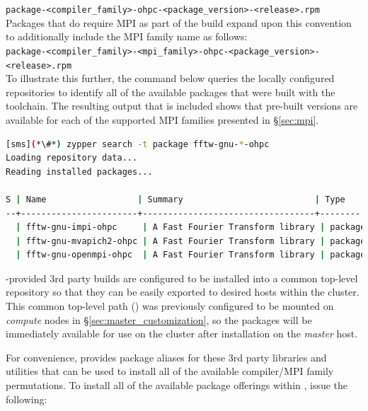 \documentclass[letterpaper]{article}
\begin{document}
\noindent
\texttt{package-<compiler\_family>-ohpc-<package\_version>-<release>.rpm} \\

\noindent Packages that do require MPI as part of the build expand upon this convention to
additionally include the MPI family name as follows: \\

\noindent
\texttt{package-<compiler\_family>-<mpi\_family>-ohpc-<package\_version>-<release>.rpm} \\

To illustrate this further, the command below queries the locally configured
repositories to identify all of the available \FFTW{} packages that were built
with the \GNU{} toolchain. The resulting output that is included shows that
pre-built versions are available for each of the supported MPI families
presented in \S\ref{sec:mpi}.

\begin{lstlisting}[language=bash]
[sms](*\#*) zypper search -t package fftw-gnu-*-ohpc
Loading repository data...
Reading installed packages...

S | Name                  | Summary                          | Type   
--+-----------------------+----------------------------------+--------
  | fftw-gnu-impi-ohpc     | A Fast Fourier Transform library | package
  | fftw-gnu-mvapich2-ohpc | A Fast Fourier Transform library | package
  | fftw-gnu-openmpi-ohpc  | A Fast Fourier Transform library | package
\end{lstlisting}

\begin{center}
\begin{tcolorbox}[]
\small
\OHPC{}-provided 3rd party builds are configured to be installed
into a common top-level repository so that they can be easily exported to
desired hosts within the cluster. This common top-level path
() was previously configured to be mounted on {\em
 compute} nodes in \S\ref{sec:master_customization}, so the packages will be
immediately available for use on the cluster after installation on the {\em
 master} host.
\end{tcolorbox}
\end{center}

For convenience, \OHPC{} provides package aliases for these 3rd
party libraries and utilities that can be used to install all of the available
compiler/MPI family permutations. To install all of the available package
offerings within \OHPC{}, issue the following:
\end{document}
